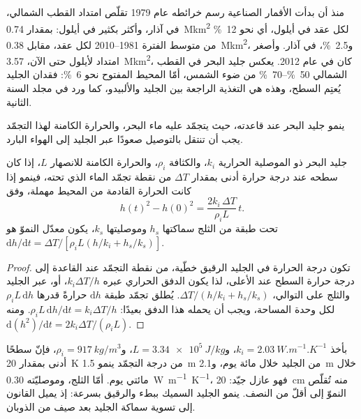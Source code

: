 منذ أن بدأت الأقمار الصناعية رسم خرائطه عام 1979 تقلّص امتداد القطب الشمالي، في
آذار، وأكثر بكثير في أيلول: بمقدار \qty{0.74}{\mega km^2} لكل عقد في
أيلول، أي نحو \qty{12}{\percent} من متوسط الفترة 1981--2010 لكل عقد، مقابل
\qty{0.38}{\mega km^2}، و\qty{2.5}{\percent}، في آذار. وأصغر امتداد
لأيلول حتى الآن، \qty{3.57}{\mega km^2}، كان في عام 2012. يعكس
جليد البحر في القطب الشمالي \qtyrange{50}{70}{\percent} من ضوء الشمس، أمّا المحيط المفتوح
نحو \qty{6}{\percent}: فقدان الجليد يُعتِم السطح، وهذه هي التغذية الراجعة
بين الجليد والألبيدو، كما ورد في مجلد السنة الثانية.

ينمو جليد البحر عند قاعدته، حيث يتجمّد عليه ماء البحر، والحرارة الكامنة
لهذا التجمّد يجب أن تنتقل بالتوصيل صعودًا عبر الجليد إلى الهواء البارد.

\begin{theorem}\label{thm:b3:glaciology:stefan}
جليد البحر ذو الموصلية الحرارية $k_i$، والكثافة $\rho_i$، والحرارة الكامنة للانصهار $L$،
إذا كان سطحه عند درجة حرارة أدنى بمقدار $\Delta T$ من نقطة
تجمّد الماء الذي تحته، فينمو إذا كانت الحرارة القادمة من المحيط
مهملة، وفق
\[
h(t)^2 - h(0)^2 = \frac{2k_i\,\Delta T}{\rho_iL}\,t .
\]
تحت طبقة من الثلج سماكتها $h_s$ وموصليتها $k_s$، يكون معدّل النموّ
هو $\mathrm dh/\mathrm dt = \Delta T/[\rho_iL(h/k_i + h_s/k_s)]$.
\end{theorem}

\begin{proof}
تكون درجة الحرارة في الجليد الرقيق خطّية، من نقطة التجمّد عند
القاعدة إلى درجة حرارة السطح عند الأعلى، لذا يكون الدفق الحراري عبره
$k_i\Delta T/h$، أو، عبر الجليد والثلج على التوالي، $\Delta T/(h/k_i +
h_s/k_s)$. يُطلق تجمّد طبقة $\mathrm dh$ حرارةً قدرها $\rho_iL\,\mathrm dh$ لكل
وحدة المساحة، ويجب أن يحمله هذا الدفق بعيدًا: $\rho_iL\,\mathrm dh/\mathrm dt
= k_i\Delta T/h$. ومنه $\mathrm d(h^2)/\mathrm dt = 2k_i\Delta T/(\rho_iL)$.
\end{proof}

بأخذ $k_i = \qty{2.03}{W.m^{-1}.K^{-1}}$، و$L = \qty{3.34e5}{J/kg}$،
و$\rho_i = \qty{917}{kg/m^3}$، فإنّ سطحًا أدنى بمقدار \qty{20}{K} من درجة التجمّد ينمو
\qty{1.5}{m} من الجليد خلال مائة يوم، و\qty{2.1}{m} خلال مائتي يوم.
أمّا الثلج، وموصليّته \qty{0.30}{W.m^{-1}.K^{-1}}، فهو عازل
جيّد: \qty{20}{cm} منه تُقلّص النموّ إلى أقلّ من النصف. ينمو الجليد السميك
ببطء والرقيق بسرعة: إذ يميل القانون إلى تسوية سماكة الجليد
بعد صيف من الذوبان.

